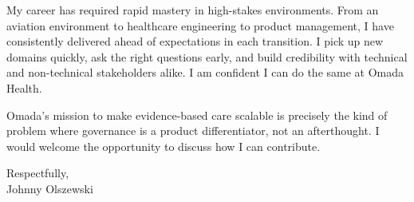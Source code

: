 \documentclass[11pt,letterpaper]{article}
\begin{document}
My career has required rapid mastery in high-stakes environments. From an aviation environment to healthcare engineering to product management, I have consistently delivered ahead of expectations in each transition. I pick up new domains quickly, ask the right questions early, and build credibility with technical and non-technical stakeholders alike. I am confident I can do the same at Omada Health.

Omada's mission to make evidence-based care scalable is precisely the kind of problem where governance is a product differentiator, not an afterthought. I would welcome the opportunity to discuss how I can contribute.

\vspace{0.5em}

Respectfully,\\
Johnny Olszewski
\end{document}
